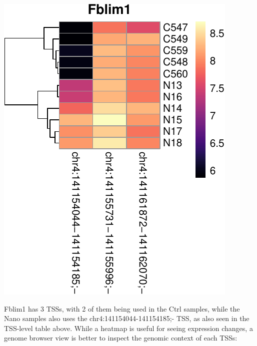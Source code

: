 \documentclass[9pt,a4paper,]{extarticle}
\newenvironment{Shaded}{\begin{snugshade}}{\end{snugshade}}
\newcommand{\KeywordTok}[1]{\textcolor[rgb]{0.13,0.29,0.53}{\textbf{{#1}}}}
\newcommand{\DataTypeTok}[1]{\textcolor[rgb]{0.13,0.29,0.53}{{#1}}}
\newcommand{\FloatTok}[1]{\textcolor[rgb]{0.00,0.00,0.81}{{#1}}}
\newcommand{\StringTok}[1]{\textcolor[rgb]{0.31,0.60,0.02}{{#1}}}
\newcommand{\CommentTok}[1]{\textcolor[rgb]{0.56,0.35,0.01}{\textit{{#1}}}}
\newcommand{\OtherTok}[1]{\textcolor[rgb]{0.56,0.35,0.01}{{#1}}}
\newcommand{\NormalTok}[1]{{#1}}
\begin{document}
\begin{center}\includegraphics{CAGEWorkflow_files/figure-latex/heatmap-1} \end{center}

Fblim1 has 3 TSSs, with 2 of them being used in the Ctrl samples, while the Nano samples also uses the chr4:141154044-141154185;- TSS, as also seen in the TSS-level table above. While a heatmap is useful for seeing expression changes, a genome browser view is better to inspect the genomic context of each TSSs:

\begin{Shaded}
\end{Shaded}
\end{document}
